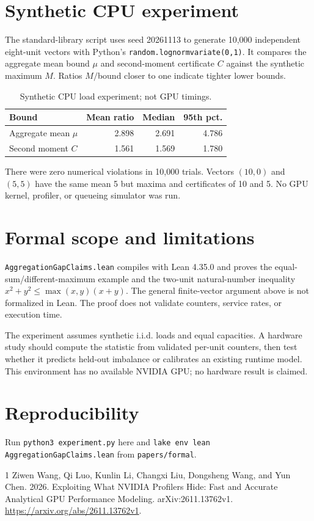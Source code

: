 \documentclass[11pt]{article}
\begin{document}
\section{Synthetic CPU experiment}
The standard-library script uses seed 20261113 to generate 10,000 independent eight-unit vectors with Python's \texttt{random.lognormvariate(0,1)}. It compares the aggregate mean bound $\mu$ and second-moment certificate $C$ against the synthetic maximum $M$. Ratios $M/$bound closer to one indicate tighter lower bounds.
\begin{table}[t]\centering\small
\begin{tabular}{lrrr}\toprule Bound & Mean ratio & Median & 95th pct.\\\midrule
Aggregate mean $\mu$ & 2.898 & 2.691 & 4.786\\
Second moment $C$ & 1.561 & 1.569 & 1.780\\\bottomrule\end{tabular}
\caption{Synthetic CPU load experiment; not GPU timings.}\end{table}
There were zero numerical violations in 10,000 trials. Vectors $(10,0)$ and $(5,5)$ have the same mean 5 but maxima and certificates of 10 and 5. No GPU kernel, profiler, or queueing simulator was run.
\section{Formal scope and limitations}
\texttt{AggregationGapClaims.lean} compiles with Lean 4.35.0 and proves the equal-sum/different-maximum example and the two-unit natural-number inequality $x^2+y^2\le\max(x,y)(x+y)$. The general finite-vector argument above is not formalized in Lean. The proof does not validate counters, service rates, or execution time.

The experiment assumes synthetic i.i.d. loads and equal capacities. A hardware study should compute the statistic from validated per-unit counters, then test whether it predicts held-out imbalance or calibrates an existing runtime model. This environment has no available NVIDIA GPU; no hardware result is claimed.
\section*{Reproducibility}
Run \texttt{python3 experiment.py} here and \texttt{lake env lean AggregationGapClaims.lean} from \texttt{papers/formal}.
\begin{thebibliography}{1}
 Ziwen Wang, Qi Luo, Kunlin Li, Changxi Liu, Dongsheng Wang, and Yun Chen. 2026. Exploiting What NVIDIA Profilers Hide: Fast and Accurate Analytical GPU Performance Modeling. arXiv:2611.13762v1. \url{https://arxiv.org/abs/2611.13762v1}.
\end{thebibliography}
\end{document}
